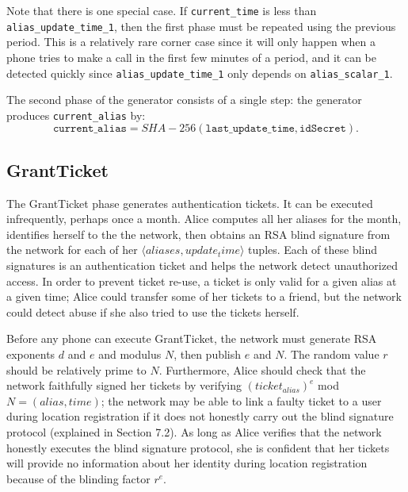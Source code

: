 \documentclass[11pt]{article}
\begin{document}
Note that there is one special case. If \texttt{current_time} is less than \texttt{alias_update_time_1}, then the first phase must be repeated using the previous period. This is a relatively rare corner case since it will only happen when a phone tries to make a call in the first few minutes of a period, and it can be detected quickly since \texttt{alias_update_time_1} only depends on \texttt{alias_scalar_1}.
	    
The second phase of the generator consists of a single step: the generator produces \texttt{current_alias} by:
\begin{equation*}
	\texttt{current_alias} = SHA-256(\texttt{last_update_time}, \texttt{idSecret}).
\end{equation*}

\subsection{GrantTicket}
The GrantTicket phase generates authentication tickets. It can be executed infrequently, perhaps once a month. Alice computes all her aliases for the month, identifies herself to the the network, then obtains an RSA blind signature from the network for each of her \texttt{$\langle aliases, update_time \rangle$} tuples. Each of these blind signatures is an authentication ticket and helps the network detect unauthorized access. In order to prevent ticket re-use, a ticket is only valid for a given alias at a given time; Alice could transfer some of her tickets to a friend, but the network could detect abuse if she also tried to use the tickets herself.

Before any phone can execute GrantTicket, the network must generate RSA exponents $d$ and $e$ and modulus $N$, then publish $e$ and $N$. The random value $r$ should be relatively prime to $N$. Furthermore, Alice should check that the network faithfully signed her tickets by verifying $(ticket_{alias})^e$ mod $N = (alias, time)$; the network may be able to link a faulty ticket to a user during location registration if it does not honestly carry out the blind signature protocol (explained in Section 7.2). As long as Alice verifies that the network honestly executes the blind signature protocol, she is confident that her tickets will provide no information about her identity during location registration because of the blinding factor $r^e$.
\end{document}
